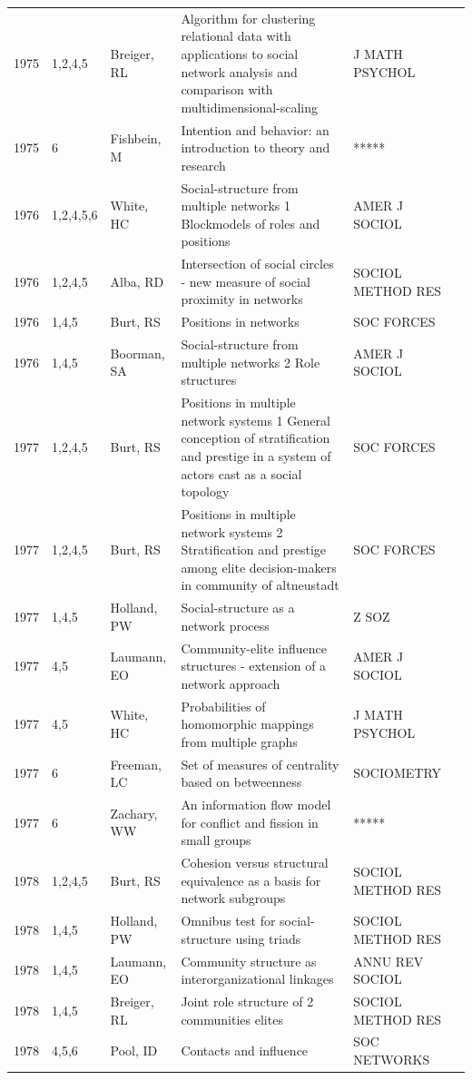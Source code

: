 \documentclass[11pt]{article} %
\begin{document}
\begin{longtable}{p{0.8cm}|p{1.25cm}|p{2.8cm}|p{7.5cm}|p{3cm}l}
1975&	1,2,4,5&	Breiger, RL&	 Algorithm for clustering relational data with applications to social network analysis and comparison with multidimensional-scaling&	J MATH PSYCHOL\\
1975&	6&	Fishbein, M&	 Intention and behavior: an introduction to theory and research&	*****\\
1976&	1,2,4,5,6&	White, HC&	 Social-structure from multiple networks 1 Blockmodels of roles and positions&	AMER J SOCIOL\\
1976&	1,2,4,5&	Alba, RD&	 Intersection of social circles - new measure of social proximity in networks&	SOCIOL METHOD RES\\
1976&	1,4,5&	Burt, RS&	 Positions in networks&	SOC FORCES\\
1976&	1,4,5&	Boorman, SA&	 Social-structure from multiple networks 2 Role structures&	AMER J SOCIOL\\
1977&	1,2,4,5&	Burt, RS&	 Positions in multiple network systems 1 General conception of stratification and prestige in a system of actors cast as a social topology&	SOC FORCES\\
1977&	1,2,4,5&	Burt, RS&	 Positions in multiple network systems 2 Stratification and prestige among elite decision-makers in community of altneustadt&	SOC FORCES\\
1977&	1,4,5&	Holland, PW&	 Social-structure as a network process&	Z SOZ\\
1977&	4,5&	Laumann, EO&	 Community-elite influence structures - extension of a network approach&	AMER J SOCIOL\\
1977&	4,5&	White, HC&	 Probabilities of homomorphic mappings from multiple graphs&	J MATH PSYCHOL\\
1977&	6&	Freeman, LC&	 Set of measures of centrality based on betweenness&	SOCIOMETRY\\
1977&	6&	Zachary, WW&	 An information flow model for conflict and fission in small groups&	*****\\
1978&	1,2,4,5&	Burt, RS&	 Cohesion versus structural equivalence as a basis for network subgroups&	SOCIOL METHOD RES\\
1978&	1,4,5&	Holland, PW&	 Omnibus test for social-structure using triads&	SOCIOL METHOD RES\\
1978&	1,4,5&	Laumann, EO&	 Community structure as interorganizational linkages&	ANNU REV SOCIOL\\
1978&	1,4,5&	Breiger, RL&	 Joint role structure of 2 communities elites&	SOCIOL METHOD RES\\
1978&	4,5,6&	Pool, ID&	 Contacts and influence&	SOC NETWORKS\\

\end{longtable}
\end{document}
